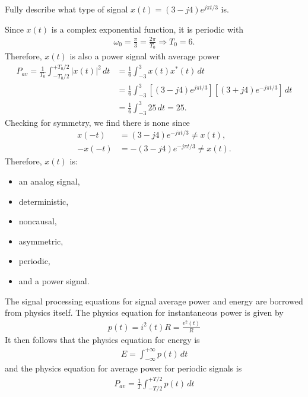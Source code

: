 \documentclass{report}
\begin{document}
\begin{example}
    Fully describe what type of signal $x(t)=(3-j4)e^{j\pi t/3}$ is.
\end{example}
\begin{solution}
    Since $x(t)$ is a complex exponential function, it is periodic with 
    \begin{align*}
        \omega_0 = \frac{\pi}{3} = \frac{2\pi}{T_0} \Longrightarrow T_0 = 6.
    \end{align*}
    Therefore, $x(t)$ is also a power signal with average power 
    \begin{align*}
        P_{av} = \frac{1}{T_0}\int_{-T_0/2}^{+T_0/2} |x(t)|^2 \,dt &= \frac{1}{6}\int_{-3}^{3} x(t)x^*(t) \,dt \\
        &= \frac{1}{6}\int_{-3}^{3} [(3-j4)e^{j\pi t/3}][(3+j4)e^{-j\pi t/3}] \,dt \\
        &= \frac{1}{6}\int_{-3}^{3} 25 \,dt = 25.
    \end{align*}
    Checking for symmetry, we find there is none since 
    \begin{align*}
        x(-t) &= (3-j4)e^{-j\pi t/3} \neq x(t), \\
        -x(-t) &= -(3-j4)e^{-j\pi t/3} \neq x(t).
    \end{align*}
    Therefore, $x(t)$ is:
    \begin{itemize}
        \item an analog signal,
        \item deterministic, 
        \item noncausal, 
        \item asymmetric,
        \item periodic,
        \item and a power signal.
    \end{itemize}
\end{solution}
The signal processing equations for signal average power and energy are borrowed from physics itself. The physics equation for instantaneous power is given by 
\begin{align}
    p(t) = i^2(t)R = \frac{v^2(t)}{R}
\end{align}
It then follows that the physics equation for energy is 
\begin{align}
    E = \int_{-\infty}^{+\infty} p(t) \,dt
\end{align}
and the physics equation for average power for periodic signals is 
\begin{align}
    P_{av} = \frac{1}{T}\int_{-T/2}^{+T/2} p(t) \,dt
\end{align}
\end{document}
